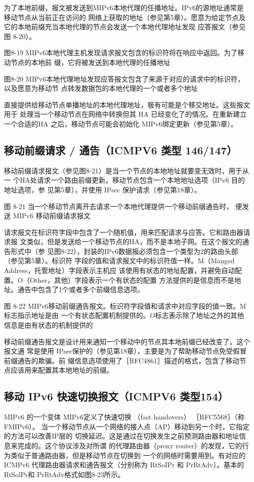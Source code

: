 为了本地前缀，报文被发送到MIPv6本地代理的任播地址。IPv6的源地址通常是移动节点从当前正在访问的
网络上获取的地址（参见第5章）。愿意为给定节点及它的本地前缀充当本地代理的节点会发送一个本地代理地址发现
应答报文（参见图 8-20）。

图8-19 MIPv6本地代理主机发现请求报文包含的标识符将在响应中返回。为了移动节点的本地前
缀，它将被发送到本地代理的任播地址

图8-20 MIPv6本地代理地址发现应答报文包含了来源于对应的请求中的标识符，以及愿意为移动节
点转发数据包的本地代理的一个或者多个地址

直接提供给移动节点单播地址的本地代理地址，极有可能是个移交地址。这些报文用于
处理当一个移动节点在网络中转换但其 HA 已经变化了的情况。在重新建立一个合适的HA
之后，移动节点可能会初始化 MIPv6绑定更新（参见第5章）。

\subsection{移动前缀请求 / 通告（ICMPV6 类型 146/147）}
移动前缀请求报文（参见图8-21）是当一个节点的本地地址就要变无效时，用于从一
个HA处请求一个路由前缀更新。移动节点包含一个本地地址选项（IPv6 目的地址选项，参
见第5章），并使用 IPsec 保护请求（参见第18章）。

图 8-21 当一个移动节点离开去请求一个本地代理提供一个移动前缀通告时，
便发送 MIPv6 移动前缀请求报文

请求报文在标识符字段中包含了一个随机值，用来匹配请求与应答。它和路由器请求报
文类似，但是发送给一个移动节点的HA，而不是本地子网。在这个报文的通告形式中（参
见图8-22），封装的IPv6数据报必须包含一个类型为2的路由头部（参见第5章）。标识符
字段的值和请求报文中的标识符值一样。M（Manged Address，托管地址）字段表示主机应
该使用有状态的地址配置，并避免自动配置。O（Other，其他）字段表示一个有状态的配置
方法提供的是信息而不是地址。通告中包含了1个或者多个前缀信息选项。

图 8-22 MIPv6移动前缀通告报文。标识符字段值和请求中对应字段的值一致。M标志指示地址是由
一个有状态配置机制提供的。O标志表示除了地址之外的其他信息是由有状态的机制提供的

移动前缀通告报文是设计用来通知一个移动中的节点其本地前缀已经改变了。这个报文通
常是使用 IPsec保护的（参见第18章），主要是为了帮助移动节点免受假冒前缀通告的欺骗。前
缀信息选项使用了［RFC4861］描述的格式，包含了移动节点应该用来配置其本地地址的前缀。
\subsection{移动 IPv6 快速切换报文（ICMPV6 类型154）}
MIPv6 的一个变体 MIPv6定义了快速切换 （fast handovers） ［RFC5568］（称 FMIPv6）。
当一个移动节点从一个网络的接人点（AP）移动到另一个时，它指定的方法可以改善IP层的
切换延迟。这是通过在切换发生之前预测路由器和地址信息来完成的。这个协议涉及对所谓
的代理路由器（proxy router）的发现，它的行为类似于普通路由器，但是移动节点在切换到
一个的网络时需要用到。有对应的ICMPv6 代理路由器请求和通告报文（分别称为 RtSoIPr
和 PrRtAdv）。基本的RtSolPr和 PrRtAdv格式如图8-23所示。

